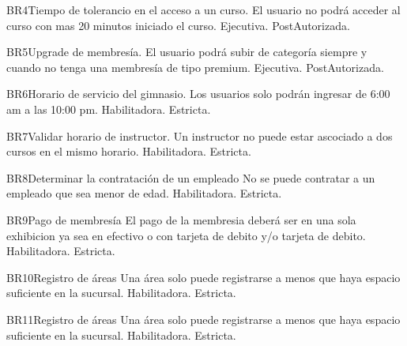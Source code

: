 \begin{BussinesRule}{BR4}{Tiempo de tolerancio en el acceso a un curso.}
	\BRitem[Descripción:] El usuario no podrá acceder al curso con mas 20 minutos iniciado el curso. 
	\BRitem[Tipo:] Ejecutiva.
	\BRitem[Nivel:] PostAutorizada.
\end{BussinesRule}

\begin{BussinesRule}{BR5}{Upgrade de membresía.}
	\BRitem[Descripción:] El usuario podrá subir de categoría siempre y cuando no tenga una membresía de tipo premium.
	\BRitem[Tipo:] Ejecutiva.
	\BRitem[Nivel:] PostAutorizada.
\end{BussinesRule}

\begin{BussinesRule}{BR6}{Horario de servicio del gimnasio.}
	\BRitem[Descripción:] Los usuarios solo podrán ingresar de 6:00 am a las 10:00 pm.
	\BRitem[Tipo:] Habilitadora.
	\BRitem[Nivel:] Estricta.
\end{BussinesRule}

\begin{BussinesRule}{BR7}{Validar horario de instructor.}
	\BRitem[Descripción:] Un instructor no puede estar ascociado a dos cursos en el mismo horario.
	\BRitem[Tipo:] Habilitadora.
	\BRitem[Nivel:] Estricta.
\end{BussinesRule}

\begin{BussinesRule}{BR8}{Determinar la contratación de un empleado}
	\BRitem[Descripción:] No se puede contratar a un empleado que sea menor de edad.
	\BRitem[Tipo:] Habilitadora.
	\BRitem[Nivel:] Estricta.
\end{BussinesRule}

\begin{BussinesRule}{BR9}{Pago de membresía}
	\BRitem[Descripción:] El pago de la membresia deberá ser en una sola exhibicion ya sea en efectivo o con tarjeta de debito y/o tarjeta de debito.
	\BRitem[Tipo:] Habilitadora.
	\BRitem[Nivel:] Estricta.
\end{BussinesRule}

\begin{BussinesRule}{BR10}{Registro de áreas}
	\BRitem[Descripción:] Una área solo puede registrarse a menos que haya espacio suficiente en la sucursal.
	\BRitem[Tipo:] Habilitadora.
	\BRitem[Nivel:] Estricta.
\end{BussinesRule}

\begin{BussinesRule}{BR11}{Registro de áreas}
	\BRitem[Descripción:] Una área solo puede registrarse a menos que haya espacio suficiente en la sucursal.
	\BRitem[Tipo:] Habilitadora.
	\BRitem[Nivel:] Estricta.
\end{BussinesRule}

